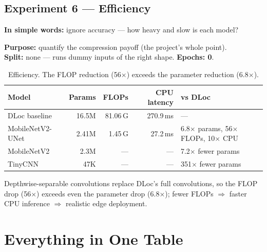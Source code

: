 \documentclass[11pt]{article}
\begin{document}
\subsection{Experiment 6 --- Efficiency}
\textbf{In simple words:} ignore accuracy --- how heavy and slow is each model?

\textbf{Purpose:} quantify the compression payoff (the project's whole point).\\
\textbf{Split:} none --- runs dummy inputs of the right shape. \quad \textbf{Epochs: 0}.

\begin{table}[h]
\centering
\footnotesize
\begin{tabular}{@{}lrrrl@{}}
\toprule
\textbf{Model} & \textbf{Params} & \textbf{FLOPs} & \textbf{CPU latency} & \textbf{vs DLoc} \\
\midrule
DLoc baseline    & 16.5M & 81.06\,G & 270.9\,ms & --- \\
MobileNetV2-UNet & 2.41M & 1.45\,G  & 27.2\,ms  & 6.8$\times$ params, 56$\times$ FLOPs, 10$\times$ CPU \\
MobileNetV2      & 2.3M  & ---      & ---       & 7.2$\times$ fewer params \\
TinyCNN          & 47K   & ---      & ---       & 351$\times$ fewer params \\
\bottomrule
\end{tabular}
\caption{Efficiency. The FLOP reduction (56$\times$) exceeds the parameter reduction (6.8$\times$).}
\end{table}

\begin{whybox}
Depthwise-separable convolutions replace DLoc's full convolutions, so the FLOP drop (56$\times$) exceeds
even the parameter drop (6.8$\times$); fewer FLOPs $\Rightarrow$ faster CPU inference $\Rightarrow$
realistic edge deployment.
\end{whybox}

\section{Everything in One Table}
\end{document}
